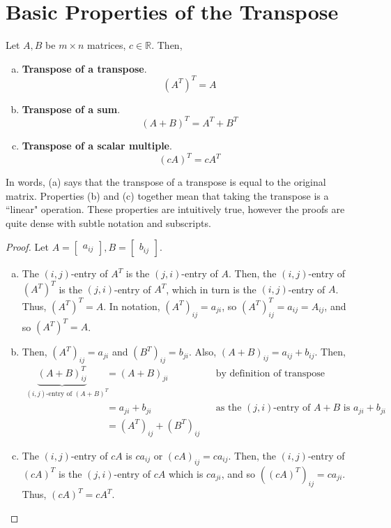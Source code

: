 \documentclass[letterpaper,12pt]{article}
\begin{document}
\section*{Basic Properties of the Transpose}
\begin{theorem}
Let $A, B$ be $m \times n$ matrices, $c \in \mathbb{R}$. Then,
\begin{enumerate}[(a)]
    \item \textbf{Transpose of a transpose}.
    \begin{equation*}
        (A^T)^T = A
    \end{equation*}
    \item \textbf{Transpose of a sum}.
    \begin{equation*}
        (A + B)^T = A^T + B^T
    \end{equation*}
    \item \textbf{Transpose of a scalar multiple}.
    \begin{equation*}
        (cA)^T = cA^T
    \end{equation*}
\end{enumerate}
\end{theorem}

In words, (a) says that the transpose of a transpose is equal to the original matrix. Properties (b) and (c) together mean that taking the transpose is a ``linear" operation. These properties are intuitively true, however the proofs are quite dense with subtle notation and subscripts.

\begin{proof}
Let $A = \begin{bmatrix} a_{ij} \end{bmatrix}, B = \begin{bmatrix} b_{ij} \end{bmatrix}$.
\begin{enumerate}[(a)]
    \item The $(i,j)$-entry of $A^T$ is the $(j,i)$-entry of $A$. Then, the $(i,j)$-entry of $(A^T)^T$ is the $(j,i)$-entry of $A^T$, which in turn is the $(i,j)$-entry of $A$. Thus, $(A^T)^T = A$. In notation, $(A^T)_{ij} = a_{ji}$, so $(A^T)^T_{ij} = a_{ij} = A_{ij}$, and so $(A^T)^T = A$.
    \item Then, $(A^T)_{ij} = a_{ji}$ and $(B^T)_{ij} = b_{ji}$. Also, $(A + B)_{ij} = a_{ij} + b_{ij}$. Then,
    \begin{align*}
        \underbrace{(A + B)^T_{ij}}_{\text{$(i,j)$-entry of $(A+B)^T$}} & = (A + B)_{ji} && \text{by definition of transpose} \\
        & = a_{ji} + b_{ji} && \text{as the $(j,i)$-entry of $A + B$ is $a_{ji} + b_{ji}$} \\
        & = (A^T)_{ij} + (B^T)_{ij}
    \end{align*}
    \item The $(i,j)$-entry of $cA$ is $ca_{ij}$ or $(cA)_{ij} = ca_{ij}$. Then, the $(i,j)$-entry of $(cA)^T$ is the $(j,i)$-entry of $cA$ which is $ca_{ji}$, and so $((cA)^T)_{ij} = ca_{ji}$. Thus, $(cA)^T = cA^T$.
\end{enumerate}
\end{proof}
\end{document}
